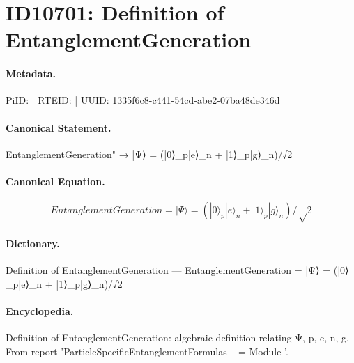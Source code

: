 \section*{ID10701: Definition of EntanglementGeneration}
\paragraph{Metadata.}
PiID:  | RTEID:  | UUID: 1335f6c8-c441-54cd-abe2-07ba48de346d

\paragraph{Canonical Statement.}
EntanglementGeneration" → |Ψ⟩ = (|0⟩\_p|e⟩\_n + |1⟩\_p|g⟩\_n)/√2

\paragraph{Canonical Equation.}
\[
EntanglementGeneration = |Ψ⟩ = (|0⟩_p|e⟩_n + |1⟩_p|g⟩_n)/√2
\]

\paragraph{Dictionary.}
Definition of EntanglementGeneration — EntanglementGeneration = |Ψ⟩ = (|0⟩\_p|e⟩\_n + |1⟩\_p|g⟩\_n)/√2

\paragraph{Encyclopedia.}
Definition of EntanglementGeneration: algebraic definition relating Ψ, p, e, n, g. From report 'ParticleSpecificEntanglementFormulas-- -= Module-'.
